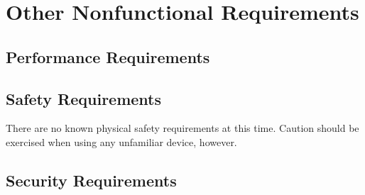 \documentclass{article}
\begin{document}
\section{Other Nonfunctional Requirements}
\subsection{Performance Requirements}

\subsection{Safety Requirements}
There are no known physical safety requirements at this time.  Caution should be exercised when using any unfamiliar device, however.\\

\subsection{Security Requirements}
\end{document}
